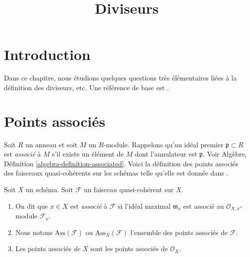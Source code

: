 

%


\title{Diviseurs}


\maketitle

\label{section-phantom}

\tableofcontents

\section{Introduction}
\label{section-introduction}

\noindent
Dans ce chapitre, nous étudions quelques questions très élémentaires liées à la
définition des diviseurs, etc. Une référence de base est  \cite{EGA}.



\section{Points associés}
\label{section-associated}

\noindent
Soit  $R$  un anneau et soit  $M$  un  $R$-module. Rappelons
qu'un idéal premier  $\mathfrak p \subset R$  est  {\it  associé}  à
 $M$  s'il existe un élément de  $M$  dont l'annulateur est
 $\mathfrak p$. Voir Algèbre, Définition  \ref{algebra-definition-associated}. Voici la définition des
points associés des faisceaux quasi-cohérents sur les schémas telle qu'elle est donnée
dans  \cite[IV définition 3.1.1]{EGA}.

\begin{definition}
\label{definition-associated}
Soit  $X$  un schéma. Soit  $\mathcal{F}$  un faisceau quasi-cohérent sur
 $X$.
\begin{enumerate}
\item On dit que  $x \in X$  est  {\it  associé}  à
 $\mathcal{F}$  si l'idéal maximal  $\mathfrak m_x$  est associé au  $\mathcal{O}_{X, x}$-module
 $\mathcal{F}_x$.
\item Nous notons  $\text{Ass}(\mathcal{F})$  ou  $\text{Ass}_X(\mathcal{F})$
l'ensemble des points associés de
 $\mathcal{F}$.
\item Les points associés  {\it  de  $X$}  sont les
points associés de  $\mathcal{O}_X$.
\end{enumerate}
\end{definition}

